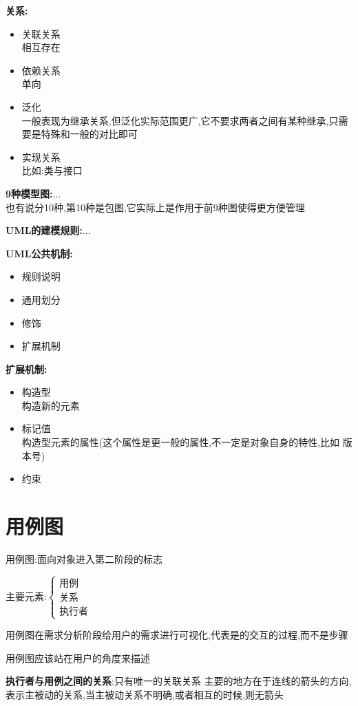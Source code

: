 \documentclass[UTF8,a4paper]{ctexart}
\newcommand{\spaceline}{\vspace{\baselineskip}}
\begin{document}
\textbf{关系:}
\begin{itemize}
  \item 关联关系\\
  相互存在
  \item 依赖关系\\
  单向
  \item 泛化\\
  一般表现为继承关系,但泛化实际范围更广,它不要求两者之间有某种继承,只需要是特殊和一般的对比即可
  \item 实现关系\\
  比如:类与接口
\end{itemize}

\textbf{9种模型图:}...\\
也有说分10种,第10种是包图,它实际上是作用于前9种图使得更方便管理

\textbf{UML的建模规则:}...

\textbf{UML公共机制:}
\begin{itemize}
  \item 规则说明
  \item 通用划分
  \item 修饰
  \item 扩展机制
\end{itemize}

\textbf{扩展机制:}
\begin{itemize}
  \item 构造型\\
  构造新的元素
  \item 标记值\\
  构造型元素的属性(这个属性是更一般的属性,不一定是对象自身的特性,比如 版本号)
  \item 约束
\end{itemize}

\section{用例图}
用例图:面向对象进入第二阶段的标志

主要元素:$\left \{\begin{array}{l}\text{用例}\\\text{关系}\\\text{执行者} \end{array} \right .$

用例图在需求分析阶段给用户的需求进行可视化,代表是的交互的过程,而不是步骤

用例图应该站在用户的角度来描述

\spaceline
\textbf{执行者与用例之间的关系}:只有唯一的关联关系
主要的地方在于连线的箭头的方向,表示主被动的关系,当主被动关系不明确,或者相互的时候,则无箭头
\end{document}
